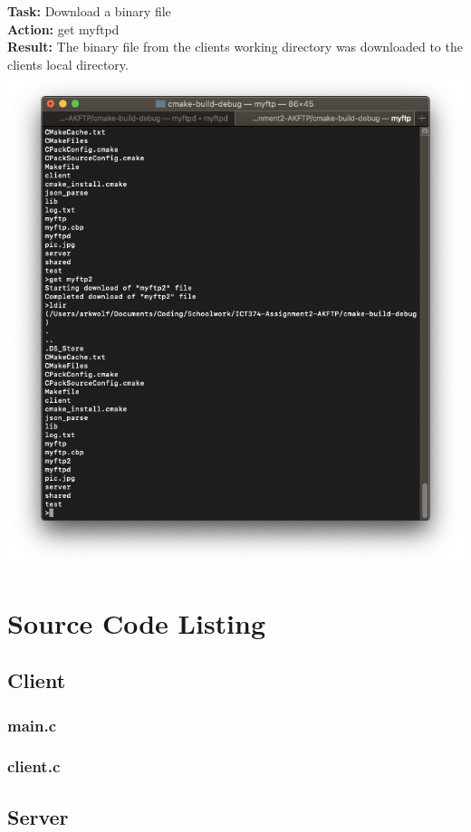 \documentclass{article}
\begin{document}
\textbf{Task:} Download a binary file\\
\textbf{Action:} get myftpd\\
\textbf{Result:} The binary file from the clients working directory was downloaded to the clients local directory.\\
\includegraphics[width=\textwidth]{testpictures/getbinary}

\newpage
\section{Source Code Listing}
\subsection{Client}
    \subsubsection{main.c}
	
	\subsubsection{client.c}
	
\subsection{Server}
\end{document}
